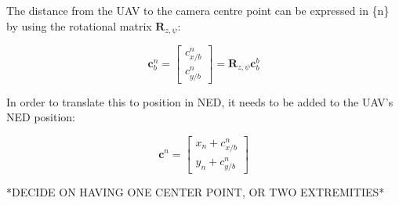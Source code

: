 \documentclass{article}
\begin{document}
The distance from the UAV to the camera centre point can be expressed in \{n\} by using the rotational matrix $\bm{R}_{z,\psi}$:

\begin{equation}
	\bm{c}^n_b = 
	\begin{bmatrix}
		c^n_{x/b} \\ c^n_{y/b}
	\end{bmatrix}
	= \bm{R}_{z, \psi}\bm{c}^b_b
\end{equation}

In order to translate this to position in NED, it needs to be added to the UAV's NED position:

\begin{equation}
	\bm{c}^n =
	\begin{bmatrix}
		x_n + c^n_{x/b} \\
		y_n + c^n_{y/b}
	\end{bmatrix}
\end{equation}

*DECIDE ON HAVING ONE CENTER POINT, OR TWO EXTREMITIES*
\end{document}
